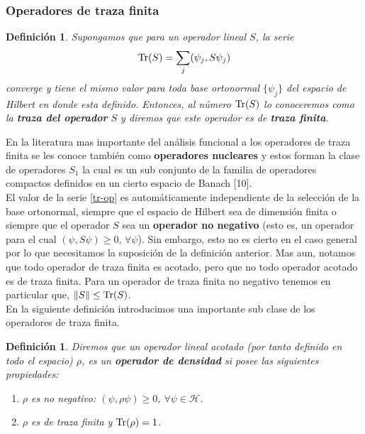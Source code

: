 \documentclass[12pt]{book}
\numberwithin{equation}{chapter}
\newtheorem{definition}[theorem]{Definici\'on}
\def\H{\mathcal{H}}
\def\Tr{\hbox{Tr}}
\begin{document}
\subsubsection{Operadores de traza finita}
\begin{definition}
Supongamos que para un operador lineal $S$, la serie 
\begin{equation}\label{tr-op}
\Tr (S) = \sum_{j} ( \psi_{j},S \psi_{j} )
\end{equation}
converge y tiene el mismo valor para toda base ortonormal $\{ \psi_{j} \}$ del espacio de Hilbert en donde esta definido. Entonces, al n\'umero $\Tr(S)$ lo conoceremos como la {\bf traza del operador} $S$ y diremos que este operador es de {\bf traza finita}.
\end{definition}

En la literatura mas importante del an\'alisis funcional a los operadores de traza finita se les conoce tambi\'en como {\bf operadores nucleares} y estos forman la clase de operadores $S_{1}$ la cual es un sub conjunto de la familia de operadores compactos definidos en un cierto espacio de Banach [10].\\

El valor de la serie \eqref{tr-op} es autom\'aticamente independiente de la selecci\'on de la base ortonormal, siempre que el espacio de Hilbert sea de dimensi\'on finita o siempre que el operador $S$ sea un {\bf operador no negativo} (esto es, un operador para el cual $(\psi,S \psi) \geq 0$, $\forall \psi $). Sin embargo, esto no es cierto en el caso general por lo que necesitamos la suposici\'on de la definici\'on anterior. Mas aun, notamos que todo operador de traza finita es acotado, pero que no todo operador acotado es de traza finita. Para un operador de traza finita no negativo tenemos en particular que, $ \|S\| \leq \Tr (S) $.\\

En la siguiente definici\'on introducimos una importante sub clase de los operadores de traza finita.

\begin{definition}\label{dens-op}
Diremos que un operador lineal acotado (por tanto definido en todo el espacio) $\rho$, es un {\bf operador de densidad} si posee las siguientes propiedades:
\begin{enumerate}
\item $\rho$ es no negativo: $ (\psi , \rho \psi) \geq 0 $, $\forall \psi \in \H$.
\item $\rho$ es de traza finita y $ \Tr (\rho)=1 $.
\end{enumerate}
\end{definition}
\end{document}
